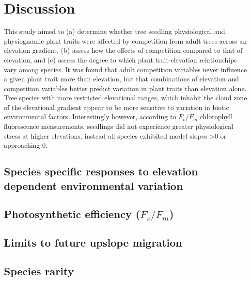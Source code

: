 \documentclass[a4paper, 11pt]{article}
\begin{document}


\section*{Discussion}

This study aimed to (a) determine whether tree seedling physiological and physiognomic plant traits were affected by competition from adult trees across an elevation gradient, (b) assess how the effects of competition compared to that of elevation, and (c) assess the degree to which plant trait-elevation relationships vary among species. It was found that adult competition variables never influence a given plant trait more than elevation, but that combinations of elevation and competition variables better predict variation in plant traits than elevation alone. Tree species with more restricted elevational ranges, which inhabit the cloud zone of the elevational gradient appear to be more sensitive to variation in biotic environmental factors. Interestingly however, according to $F_v/F_m$ chlorophyll fluorescence measurements, seedlings did not experience greater physiological stress at higher elevations, instead all species exhibited model slopes \textgreater{}0 or approaching 0.

\subsection{Species specific responses to elevation dependent environmental variation}

\subsection{Photosynthetic efficiency ($F_v/F_m$)}

\subsection{Limits to future upslope migration}

\subsection{Species rarity}
\end{document}
